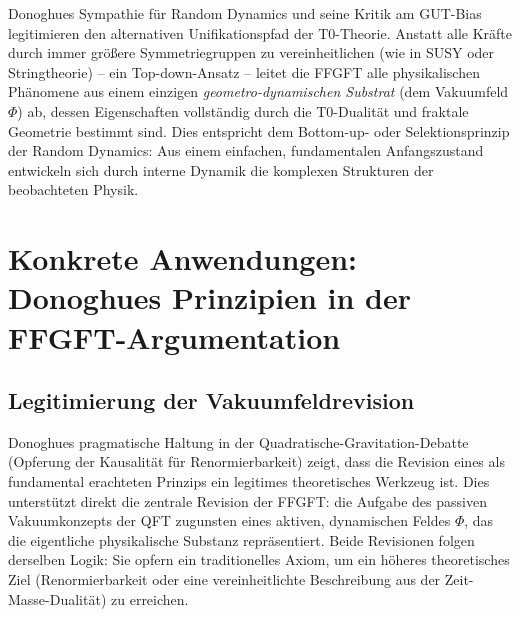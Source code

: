 	Donoghues Sympathie für Random Dynamics und seine Kritik am GUT-Bias legitimieren den alternativen Unifikationspfad der T0-Theorie. Anstatt alle Kräfte durch immer größere Symmetriegruppen zu vereinheitlichen (wie in SUSY oder Stringtheorie) – ein Top-down-Ansatz – leitet die FFGFT alle physikalischen Phänomene aus einem einzigen \emph{geometro-dynamischen Substrat} (dem Vakuumfeld $\Phi$) ab, dessen Eigenschaften vollständig durch die T0-Dualität und fraktale Geometrie bestimmt sind. Dies entspricht dem Bottom-up- oder Selektionsprinzip der Random Dynamics: Aus einem einfachen, fundamentalen Anfangszustand entwickeln sich durch interne Dynamik die komplexen Strukturen der beobachteten Physik.
	
	\section{Konkrete Anwendungen: Donoghues Prinzipien in der FFGFT-Argumentation}
	
	\subsection{Legitimierung der Vakuumfeldrevision}
	Donoghues pragmatische Haltung in der Quadratische-Gravitation-Debatte (Opferung der Kausalität für Renormierbarkeit) zeigt, dass die Revision eines als fundamental erachteten Prinzips ein legitimes theoretisches Werkzeug ist. Dies unterstützt direkt die zentrale Revision der FFGFT: die Aufgabe des passiven Vakuumkonzepts der QFT zugunsten eines aktiven, dynamischen Feldes $\Phi$, das die eigentliche physikalische Substanz repräsentiert. Beide Revisionen folgen derselben Logik: Sie opfern ein traditionelles Axiom, um ein höheres theoretisches Ziel (Renormierbarkeit oder eine vereinheitlichte Beschreibung aus der Zeit-Masse-Dualität) zu erreichen.
	
